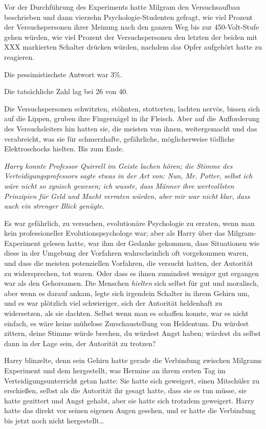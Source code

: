 {Vor der Durchführung des Experiments hatte Milgram den Versuchsaufbau beschrieben und dann vierzehn Psychologie-Studenten gefragt, wie viel Prozent der Versuchspersonen ihrer Meinung nach den ganzen Weg bis zur 450-Volt-Stufe gehen würden, wie viel Prozent der Versuchspersonen den letzten der beiden mit XXX markierten Schalter drücken würden, nachdem das Opfer aufgehört hatte zu reagieren.

Die pessimistischste Antwort war 3\%.

Die tatsächliche Zahl lag bei 26 von 40.

Die Versuchspersonen schwitzten, stöhnten, stotterten, lachten nervös, bissen sich auf die Lippen, gruben ihre Fingernägel in ihr Fleisch. Aber auf die Aufforderung des Versuchsleiters hin hatten sie, die meisten von ihnen, weitergemacht und das verabreicht, was sie für schmerzhafte, gefährliche, möglicherweise tödliche Elektroschocks hielten. Bis zum Ende.

\emph{Harry konnte Professor Quirrell im Geiste lachen hören; die Stimme des Verteidigungsprofessors sagte etwas in der Art von: \emph{Nun, Mr. Potter, selbst ich wäre} \emph{nicht so zynisch gewesen; ich wusste, dass Männer ihre wertvollsten Prinzipien für Geld und Macht verraten würden, aber mir war nicht klar, dass auch ein strenger Blick genügte.}}

Es war gefährlich, zu versuchen, evolutionäre Psychologie zu erraten, wenn man kein professioneller Evolutionspsychologe war; aber als Harry über das Milgram-Experiment gelesen hatte, war ihm der Gedanke gekommen, dass Situationen wie diese in der Umgebung der Vorfahren wahrscheinlich oft vorgekommen waren, und dass die meisten potenziellen Vorfahren, die versucht hatten, der Autorität zu widersprechen, tot waren. Oder dass es ihnen zumindest weniger gut ergangen war als den Gehorsamen. Die Menschen \emph{hielten} sich selbst für gut und moralisch, aber wenn es darauf ankam, legte sich irgendein Schalter in ihrem Gehirn um, und es war plötzlich viel schwieriger, sich der Autorität heldenhaft zu widersetzen, als sie dachten. Selbst wenn man es schaffen konnte, war es nicht einfach, es wäre keine mühelose Zurschaustellung von Heldentum. Du würdest zittern, deine Stimme würde brechen, du würdest Angst haben; würdest du selbst dann in der Lage sein, der Autorität zu trotzen?

Harry blinzelte, denn sein Gehirn hatte gerade die Verbindung zwischen Milgrams Experiment und dem hergestellt, was Hermine an ihrem ersten Tag im Verteidigungsunterricht getan hatte: Sie hatte sich geweigert, einen Mitschüler zu erschießen, selbst als die Autorität ihr gesagt hatte, dass sie es tun müsse, sie hatte gezittert und Angst gehabt, aber sie hatte sich trotzdem geweigert. Harry hatte das direkt vor seinen eigenen Augen gesehen, und er hatte die Verbindung bis jetzt noch nicht hergestellt…

}
